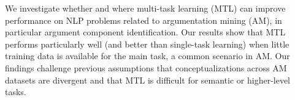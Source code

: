 We investigate whether and where multi-task learning (MTL) can improve performance on NLP problems related to argumentation mining (AM), in particular argument component identification. Our results show that MTL performs particularly well (and better than single-task learning) when little training data is available for the main task, a common scenario in AM. Our findings challenge previous assumptions that conceptualizations across AM datasets are divergent and that MTL is difficult for semantic or higher-level tasks.

